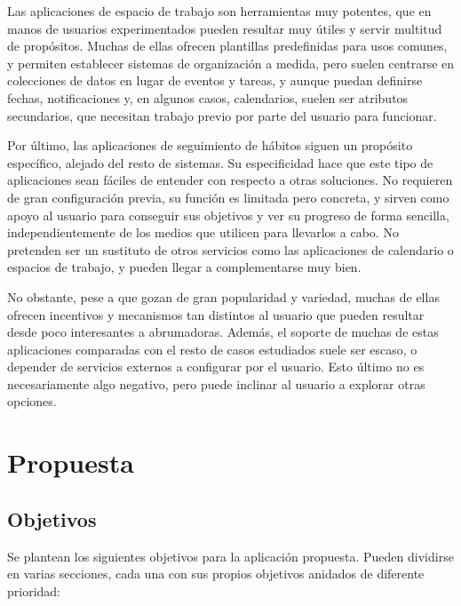 \documentclass[10pt, a4paper]{aqademic}
\begin{document}
\medskip

Las aplicaciones de espacio de trabajo son herramientas muy potentes, que en manos de usuarios experimentados pueden resultar muy útiles y servir multitud de propósitos. Muchas de ellas ofrecen plantillas predefinidas para usos comunes, y permiten establecer sistemas de organización a medida, pero suelen centrarse en colecciones de datos en lugar de eventos y tareas, y aunque puedan definirse fechas, notificaciones y, en algunos casos, calendarios, suelen ser atributos secundarios, que necesitan trabajo previo por parte del usuario para funcionar.

\medskip

Por último, las aplicaciones de seguimiento de hábitos siguen un propósito específico, alejado del resto de sistemas. Su especificidad hace que este tipo de aplicaciones sean fáciles de entender con respecto a otras soluciones. No requieren de gran configuración previa, su función es limitada pero concreta, y sirven como apoyo al usuario para conseguir sus objetivos y ver su progreso de forma sencilla, independientemente de los medios que utilicen para llevarlos a cabo. No pretenden ser un sustituto de otros servicios como las aplicaciones de calendario o espacios de trabajo, y pueden llegar a complementarse muy bien.

No obstante, pese a que gozan de gran popularidad y variedad, muchas de ellas ofrecen incentivos y mecanismos tan distintos al usuario que pueden resultar desde poco interesantes a abrumadoras. Además, el soporte de muchas de estas aplicaciones comparadas con el resto de casos estudiados suele ser escaso, o depender de servicios externos a configurar por el usuario. Esto último no es necesariamente algo negativo, pero puede inclinar al usuario a explorar otras opciones.




\section{Propuesta}

\subsection{Objetivos}

Se plantean los siguientes objetivos para la aplicación propuesta. Pueden dividirse en varias secciones, cada una con sus propios objetivos anidados de diferente prioridad:
\end{document}

